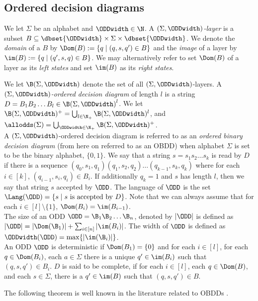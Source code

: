 \subsection{Ordered decision diagrams} 
We let $\Sigma$ be an alphabet and $\ODDwidth \in \N$. A  $(\Sigma, \ODDwidth)$\emph{-layer} is a subset $B \subseteq \dbset{\ODDwidth} \times \Sigma \times \dbset{\ODDwidth}$. We denote the \emph{domain} of a $B$ by $\Dom(B):= \{q \;|\; (q,s,q') \in B\}$ and the \emph{image} of a layer by $\im(B):= \{q \;|\; (q',s,q) \in B\}$. We may alternatively refer to set $\Dom(B)$ of a layer as its \textit{left states} and set \textit{$\im(B)$} as its \textit{right states}.

We let  $\B(\Sigma, \ODDwidth)$ denote the set of all $(\Sigma,\ODDwidth)$-layers. A $(\Sigma,\ODDwidth)$\emph{-ordered decision diagram} of length $l$ is a string $D = B_1B_2\ldots B_l \in {\B(\Sigma, \ODDwidth)}^l$. We let $\B(\Sigma,\ODDwidth)^{+} = \bigcup_{l\in \N_+}\B(\Sigma,\ODDwidth)^{l}$, and $\allodds(\Sigma) = \bigcup_{\ODDwidth\in \N_+} \B(\Sigma,\ODDwidth)^+$. 
\\ 
A $(\Sigma,\ODDwidth)$-ordered decision diagram is referred to as an \emph{ordered binary decision diagram} (from here on referred to as an OBDD) when alphabet $\Sigma$ is set to be the binary alphabet, $\{0,1\}$. We say that a string $s=s_1 s_2 \ldots s_k$ is read by $D$ if there is a sequence $(q_0, s_1,q_1)(q_1,s_2,q_2)\ldots(q_{k-1},s_k,q_k)$ where for each $i \in [k]$, $(q_{i-1},s_i,q_i) \in B_i$. If additionally $q_k = 1$ and $s$ has length $l$, then we say that string $s$ accepted by $\ODD$. The language of $\ODD$ is the set $\Lang(\ODD)= \{s\; | \; s \text{ is accepted by } D\}$. Note that we can always assume that for each $i \in [l] \setminus \{1\}$, $\Dom(B_i) = \im(B_{i-1})$. \
\\
The size of an ODD $\ODD = \B_1\B_2\dots \B_n$, denoted by $|\ODD|$ 
is defined as $|\ODD| = |\Dom(\B_1)|+\sum_{i\in [n]} |\im(B_i)|$. The width 
of $\ODD$ is defined as $\ODDwidth(\ODD) = \max\{|\im(\B_i)|\}$. 
\\ 
An ODD $\ODD$ is deterministic if $\Dom(B_1) = \{0\}$ and for each $i \in [l]$, for each $q \in \Dom(B_i)$, each $a \in \Sigma$ there is a unique $q'\in \im(B_i)$ such that $(q,s,q') \in B_i$. $D$ is said to be complete, if for each 
$i\in [l]$, each $q\in \Dom(B)$, and each $s\in \Sigma$, 
there is a $q'\in \im(B)$ such that $(q,s,q')\in B$.

The following theorem is well known in the literature related to OBDDs \cite{bryant1986graph}. 


